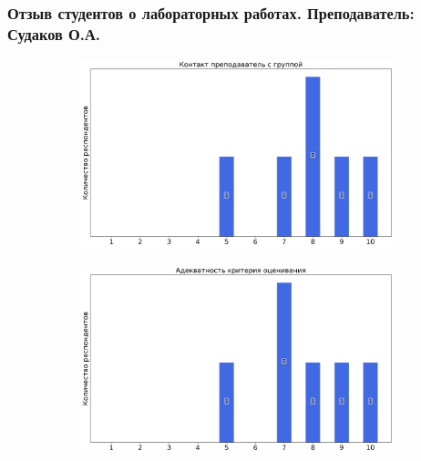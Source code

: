         \subsubsection{Отзыв студентов о лабораторных работах. Преподаватель: Судаков О.А.}
            \begin{figure}[H]
                \centering
                \begin{subfigure}[b]{0.45\textwidth}
                    \centering
                    \includegraphics[width=\textwidth]{images/3 course/Общая физика - квантовая физика/labniks-marks-Судаков О.А.-0.png}
                \end{subfigure}
                \begin{subfigure}[b]{0.45\textwidth}
                    \centering
                    \includegraphics[width=\textwidth]{images/3 course/Общая физика - квантовая физика/labniks-marks-Судаков О.А.-1.png}
                \end{subfigure}
                \begin{subfigure}[b]{0.45\textwidth}

\end{subfigure}
\end{figure}
